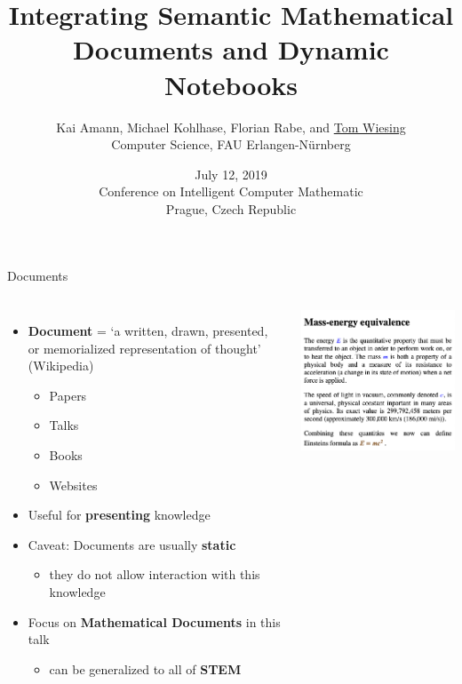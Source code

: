 \documentclass{beamer}
\title[Semantic Documents and Dynamic Notebooks]{Integrating Semantic Mathematical Documents and Dynamic Notebooks}
\author[Tom Wiesing et al.]{Kai Amann, Michael Kohlhase, Florian Rabe, and \underline{Tom Wiesing}\\Computer Science, FAU Erlangen-N{\"u}rnberg}
\date[July 12 2019, CICM Prague]{July 12, 2019\\Conference on Intelligent Computer Mathematic\\Prague, Czech Republic}
\begin{document}
    \frame{\titlepage}
    \begin{frame}{Documents}
        \begin{columns}
            \begin{itemize}
                \item \textbf{Document} = `a written, drawn, presented, or memorialized representation of thought' (Wikipedia)
                \begin{itemize}
                    \item Papers
                    \item Talks
                    \item Books
                    \item Websites
                \end{itemize}
                \item Useful for \textbf{presenting} knowledge
                \item Caveat: Documents are usually \textbf{static}
                \begin{itemize}
                    \item they do not allow interaction with this knowledge
                \end{itemize}
                \item Focus on \textbf{Mathematical Documents} in this talk
                \begin{itemize}
                    \item can be generalized to all of \textbf{STEM}
                \end{itemize}
            \end{itemize}
            \includegraphics[scale=0.25]{images/doc}
        \end{columns}
    \end{frame}
\end{document}
